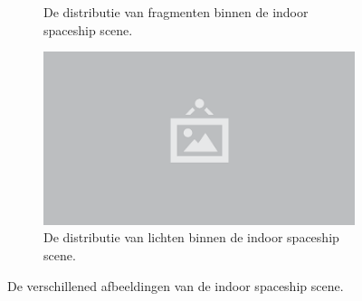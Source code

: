 \begin{figure}[p]
\begin{subfigure}[b]{.49\linewidth}
    \caption{De distributie van fragmenten binnen de indoor spaceship scene.}\label{fig:test-suite-spaceship:fragments}
  \end{subfigure}%
  \begin{subfigure}[b]{.49\linewidth}
    \centering\includegraphics{./img/raw/placeholder.png}
    \caption{De distributie van lichten binnen de indoor spaceship scene.}\label{fig:test-suite-spaceship:lights}
  \end{subfigure}%
  \caption{De verschillened afbeeldingen van de indoor spaceship scene.}
  \label{fig:test-suite-spaceship-images}
\end{figure}
